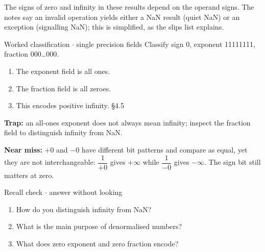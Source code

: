 \documentclass[11pt]{article}
\begin{document}
\begin{keepsection}
\begin{keepsection}
The signs of zero and infinity in these results depend on the operand signs. The notes say an invalid operation yields either a NaN result (quiet NaN) or an exception (signalling NaN); this is simplified, as the slips list explains.

\begin{workedbox}{Worked classification \ensuremath{\cdot} single precision fields}
Classify sign 0, exponent 11111111, fraction 000…000.

\begin{enumerate}
\item The exponent field is all ones.
\item The fraction field is all zeroes.
\item This encodes positive infinity. \hfill{\small\color{FAUblue}§4.5}
\end{enumerate}
\end{workedbox}

\begin{notebox}\textbf{Trap:} an all-ones exponent does not always mean infinity; inspect the fraction field to distinguish infinity from NaN.\end{notebox}

\begin{notebox}\textbf{Near miss:} +0 and \ensuremath{-}0 have different bit patterns and compare as equal, yet they are not interchangeable: {\small\ensuremath{\dfrac{1}{+0}}} gives +\ensuremath{\infty} while {\small\ensuremath{\dfrac{1}{-0}}} gives \ensuremath{-}\ensuremath{\infty}. The sign bit still matters at zero.\end{notebox}

\begin{recallbox}{Recall check \ensuremath{\cdot} answer without looking}
\begin{enumerate}
\item How do you distinguish infinity from NaN?
\item What is the main purpose of denormalised numbers?
\item What does zero exponent and zero fraction encode?
\end{enumerate}

\end{recallbox}
\end{keepsection}
\end{keepsection}
\end{document}
